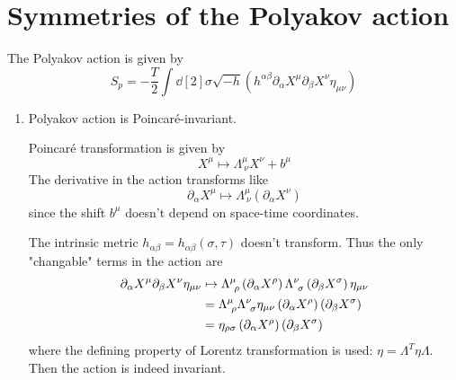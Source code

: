 \section{Symmetries of the Polyakov action}
The Polyakov action is given by 
\begin{equation}
	S_p = -\frac{T}{2} \int \dd[2]{\sigma} \sqrt{-h} \left( h^{\alpha \beta} \partial_\alpha X^\mu \partial_\beta X^\nu \eta_{\mu\nu} \right)
\end{equation}

\begin{enumerate}[label=(\alph*)]
	\item Polyakov action is Poincaré-invariant.
	
		Poincaré transformation is given by
		\begin{equation*}
			X^\mu \mapsto \Lambda^{\mu}_{\ \nu} X^\nu + b^\mu
		\end{equation*}
		The derivative in the action transforms like
		\begin{equation*}
			\partial_\alpha X^\mu \mapsto \Lambda^\mu_{\ \nu} \left( \partial_\alpha X^\nu \right)
		\end{equation*}
		since the shift $b^\mu$ doesn't depend on space-time coordinates.

		The intrinsic metric $h_{\alpha\beta} = h_{\alpha \beta} (\sigma, \tau)$ doesn't transform. Thus the only "changable" terms in the action are
		\begin{align}
			\partial_\alpha X^\mu \partial_\beta X^\nu \eta_{\mu\nu} &\mapsto \Lambda^\mu_{\ \rho} \left( \partial_\alpha X^\rho \right) \Lambda^\nu_{\ \sigma} \left( \partial_\beta X^\sigma \right) \eta_{\mu\nu} \notag \\
																						&= \Lambda^{\mu }_{\ \rho} \Lambda^\nu_{\ \sigma} \eta_{\mu\nu} \left( \partial_\alpha X^\rho \right) \left( \partial_\beta X^\sigma \right) \notag \\
																						&= \eta_{\rho\sigma} \left( \partial_\alpha X^\rho \right) \left( \partial_\beta X^\sigma \right)
		\end{align}
		where the defining property of Lorentz transformation is used: $\eta = \Lambda^T \eta \Lambda$. Then the action is indeed invariant.


\end{enumerate}
